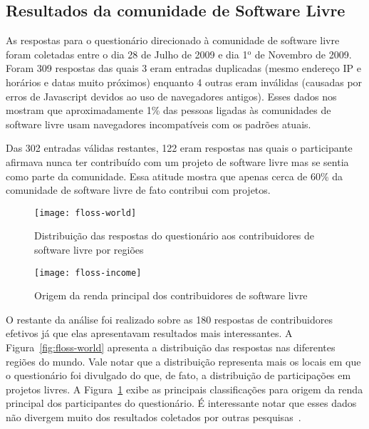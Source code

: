 \subsection{Resultados da comunidade de Software Livre}
\label{sec:resp-floss}

As respostas para o questionário direcionado à comunidade de software
livre foram coletadas entre o dia 28 de Julho de 2009 e dia
1$^\textrm{o}$ de Novembro de 2009. Foram 309 respostas das quais 3
eram entradas duplicadas (mesmo endereço IP e horários e datas muito
próximos) enquanto 4 outras eram inválidas (causadas por erros de
Javascript devidos ao uso de navegadores antigos). Esses dados nos
mostram que aproximadamente 1\% das pessoas ligadas às comunidades de
software livre usam navegadores incompatíveis com os padrões atuais.

Das 302 entradas válidas restantes, 122 eram respostas nas quais o
participante afirmava nunca ter contribuído com um projeto de software
livre mas se sentia como parte da comunidade. Essa atitude mostra que
apenas cerca de 60\% da comunidade de software livre de fato contribui
com projetos.


\begin{figure}[hbt]
  \begin{minipage}[t]{0.5\linewidth}
    \centering
    \texttt{[image: floss-world]}
    \caption{Distribuição das respostas do questionário aos
      contribuidores de software livre por regiões}
    \label{fig:floss-world}
  \end{minipage}
  \begin{minipage}[t]{0.5\linewidth}
    \centering
    \texttt{[image: floss-income]}
    \caption{Origem da renda principal dos contribuidores de software
      livre}
    \label{fig:floss-income}
  \end{minipage}
\end{figure}

O restante da análise foi realizado sobre as 180 respostas de
contribuidores efetivos já que elas apresentavam resultados mais
interessantes. A Figura~\ref{fig:floss-world} apresenta a distribuição
das respostas nas diferentes regiões do mundo. Vale notar que a
distribuição representa mais os locais em que o questionário foi
divulgado do que, de fato, a distribuição de participações em projetos
livres. A Figura~\ref{fig:floss-income} exibe as principais
classificações para origem da renda principal dos participantes do
questionário. É interessante notar que esses dados não divergem muito
dos resultados coletados por outras pesquisas~\cite{FlossStats}.

